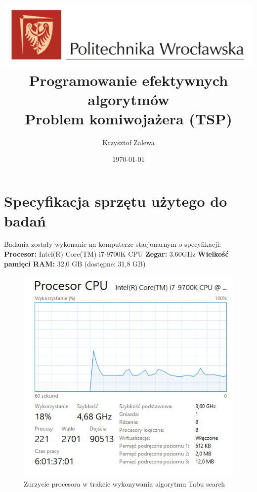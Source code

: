 \documentclass{article}
\title{
  \centering
  \includegraphics[width=\textwidth]{src/images/logo_PWr_kolor_poziom.png}\\
  \fontsize{28pt}{30pt}\selectfont Programowanie efektywnych algorytmów\\
  \fontsize{14pt}{30pt}\selectfont Problem komiwojażera (TSP)}
\author{Krzysztof Zalewa}
\date{\daymonthyear\today}
\begin{document}
    \maketitle
    \pagebreak
    \tableofcontents
    \FloatBarrier
    \raggedright
    \section{Specyfikacja sprzętu użytego do badań}
      Badania zostały wykonanie na komputerze stacjonarnym o specyfikacji: \linebreak
      \textbf{Procesor:} Intel(R) Core(TM) i7-9700K CPU \linebreak
      \textbf{Zegar:} 3.60GHz \linebreak
      \textbf{Wielkość pamięci RAM:} 32,0 GB (dostępne: 31,8 GB) \linebreak
      \begin{figure}[ht]
        \centering
        \includegraphics[width=\textwidth]{src/images/Zurzycie_procesora_Tabu.png}
        \caption{Zurzycie procesora w trakcie wykonywania algorytmu Tabu search}
        \label{fig:procTabu}
      \end{figure}
      \FloatBarrier
      
\end{document}
